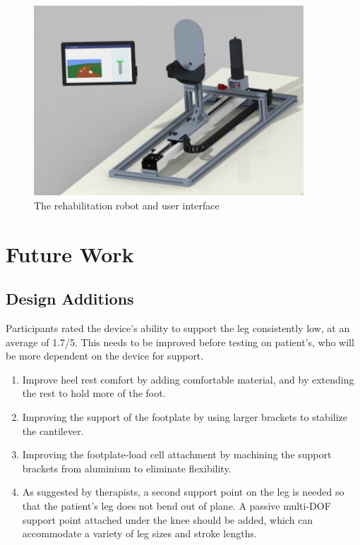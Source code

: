 \documentclass[12pt]{report}
\begin{document}
\begin{figure}[h]
	\centering
	\includegraphics[width=0.9\textwidth]{robot_cad}
	\caption{The rehabilitation robot and user interface}
	\label{fig:robot_cad}
\end{figure}		
		

	\section{Future Work} \label{sec:future_work}
	
	\subsection{Design Additions}
	
	Participants rated the device's ability to support the leg consistently low, at an average of 1.7/5. This needs to be improved before testing on patient's, who will be more dependent on the device for support. 
	
	\begin{enumerate}
		\item Improve heel rest comfort by adding comfortable material, and by extending the rest to hold more of the foot. 
		\item Improving the support of the footplate by using larger brackets to stabilize the cantilever. 
		\item Improving the footplate-load cell attachment by machining the support brackets from aluminium to eliminate flexibility. 
		\item As suggested by therapists, a second support point on the leg is needed so that the patient's leg does not bend out of plane. A passive multi-DOF support point attached under the knee should be added, which can accommodate a variety of leg sizes and stroke lengths. 
	\end{enumerate}		
	
\end{document}
